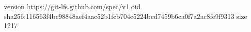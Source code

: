 version https://git-lfs.github.com/spec/v1
oid sha256:116563f4bc98848aef4aac52b1fcb704c5224bcd7459b6ca0f7a2ac8fe9f9313
size 1217
